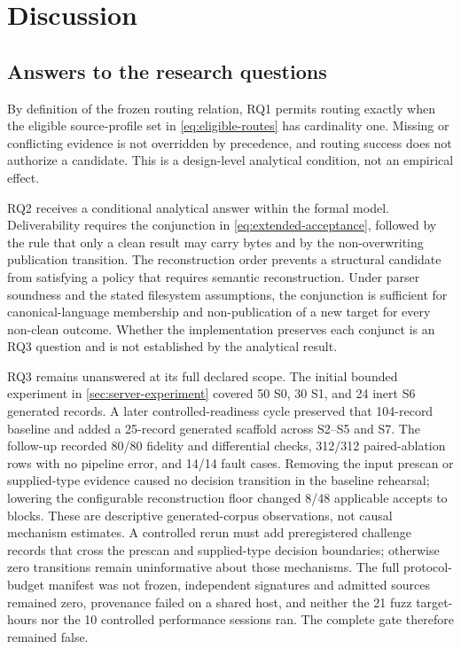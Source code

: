 \section{Discussion}
\label{sec:discussion}

\subsection{Answers to the research questions}

By definition of the frozen routing relation, RQ1 permits routing exactly when
the eligible source-profile set in \cref{eq:eligible-routes} has cardinality
one. Missing or conflicting evidence is not overridden by precedence, and
routing success does not authorize a candidate. This is a design-level
analytical condition, not an empirical effect.

RQ2 receives a conditional analytical answer within the formal model.
Deliverability requires the conjunction in \cref{eq:extended-acceptance},
followed by the rule that only a clean result may carry bytes and by the
non-overwriting publication transition. The
reconstruction order prevents a structural candidate from satisfying a policy
that requires semantic reconstruction. Under parser soundness and the stated
filesystem assumptions, the conjunction is sufficient for canonical-language
membership and non-publication of a new target for every non-clean outcome.
Whether the implementation preserves each conjunct is an RQ3 question and is
not established by the analytical result.

RQ3 remains unanswered at its full declared scope. The initial bounded
experiment in \cref{sec:server-experiment} covered 50 S0, 30 S1, and 24 inert
S6 generated records. A later controlled-readiness cycle preserved that
104-record baseline and added a 25-record generated scaffold across S2--S5 and
S7. The follow-up recorded 80/80 fidelity and differential checks, 312/312
paired-ablation rows with no pipeline error, and 14/14 fault cases. Removing the
input prescan or supplied-type evidence caused no decision transition in the
baseline rehearsal; lowering the configurable reconstruction floor changed
8/48 applicable accepts to blocks. These are descriptive generated-corpus
observations, not causal mechanism estimates. A controlled rerun must add
preregistered challenge records that cross the prescan and supplied-type
decision boundaries; otherwise zero transitions remain uninformative about
those mechanisms. The full protocol-budget manifest
was not frozen, independent signatures and admitted sources remained zero,
provenance failed on a shared host, and neither the 21 fuzz target-hours nor the
10 controlled performance sessions ran. The complete gate therefore remained
false.

